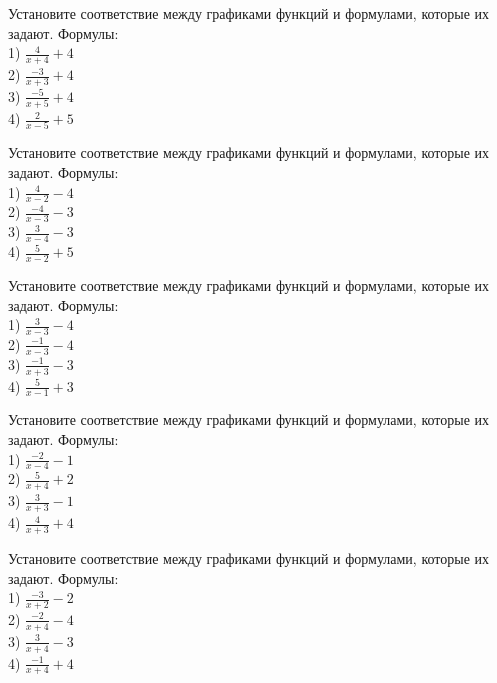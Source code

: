 \documentclass[4apaper]{article}
\begin{document}
\begin{taskBN}{6}
Установите соответствие между графиками функций и формулами, которые их задают. Формулы: \\1) $\frac{4}{x+4}+4$\\2) $\frac{-3}{x+3}+4$\\3) $\frac{-5}{x+5}+4$\\4) $\frac{2}{x-5}+5$
\end{taskBN}

\begin{taskBN}{7}
Установите соответствие между графиками функций и формулами, которые их задают. Формулы: \\1) $\frac{4}{x-2}-4$\\2) $\frac{-4}{x-3}-3$\\3) $\frac{3}{x-4}-3$\\4) $\frac{5}{x-2}+5$
\end{taskBN}

\begin{taskBN}{8}
Установите соответствие между графиками функций и формулами, которые их задают. Формулы: \\1) $\frac{3}{x-3}-4$\\2) $\frac{-1}{x-3}-4$\\3) $\frac{-1}{x+3}-3$\\4) $\frac{5}{x-1}+3$
\end{taskBN}

\begin{taskBN}{9}
Установите соответствие между графиками функций и формулами, которые их задают. Формулы: \\1) $\frac{-2}{x-4}-1$\\2) $\frac{5}{x+4}+2$\\3) $\frac{3}{x+3}-1$\\4) $\frac{4}{x+3}+4$
\end{taskBN}

\begin{taskBN}{10}
Установите соответствие между графиками функций и формулами, которые их задают. Формулы: \\1) $\frac{-3}{x+2}-2$\\2) $\frac{-2}{x+4}-4$\\3) $\frac{3}{x+4}-3$\\4) $\frac{-1}{x+4}+4$
\end{taskBN}
\end{document}
